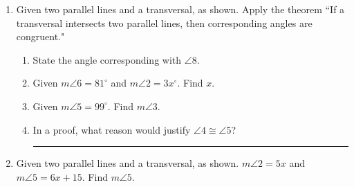 \documentclass[12pt, twoside]{article}
\begin{document}
  \begin{enumerate}
    \item Given two parallel lines and a transversal, as shown. Apply the theorem ``If a transversal intersects two parallel lines, then corresponding angles are congruent."
      \begin{center}
      \end{center}
      \begin{enumerate}
        \item State the angle corresponding with $\angle 8$. \bigskip
        \item Given $m\angle 6 = 81^\circ$ and $m\angle 2 = 3x^\circ$. Find $x$. \bigskip
        \item Given $m\angle 5 = 99^\circ$. Find $m\angle 3$. \bigskip
        \item In a proof, what reason would justify $\angle 4 \cong \angle 5$? \rule{6cm}{0.15mm}
      \end{enumerate}

    \item Given two parallel lines and a transversal, as shown. $m\angle 2=5x$ and $m\angle 5=6x+15$. Find $m\angle 5$.
        \begin{center}
        \end{center}


\end{enumerate}
\end{document}
